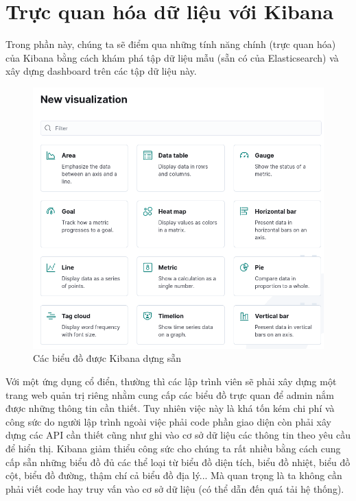 \section{Trực quan hóa dữ liệu với Kibana}
Trong phần này, chúng ta sẽ điểm qua những tính năng chính (trực quan hóa) của Kibana bằng cách khám phá tập dữ liệu mẫu (sẵn có của Elasticsearch) và xây dựng dashboard trên các tập dữ liệu này.

\begin{figure}[H] %
    \centering %
    \includegraphics[width=1\textwidth]{figures/kibana_charts.png} 
    \caption{Các biểu đồ được Kibana dựng sẵn} %
    \label{fig:elk_01}
\end{figure}

Với một ứng dụng cổ điển, thường thì các lập trình viên sẽ phải xây dựng một trang web quản trị riêng nhằm cung cấp các biểu đồ trực quan để admin nắm được những thông tin cần thiết. Tuy nhiên việc này là khá tốn kém chi phí và công sức do người lập trình ngoài việc phải code phần giao diện còn phải xây dựng các API cần thiết cũng như ghi vào cơ sở dữ liệu các thông tin theo yêu cầu để hiển thị. Kibana giảm thiểu công sức cho chúng ta rất nhiều bằng cách cung cấp sẵn những biểu đồ đủ các thể loại từ biểu đồ diện tích, biểu đồ nhiệt, biểu đồ cột, biểu đồ đường, thậm chí cả biểu đồ địa lý... Mà quan trọng là ta không cần phải viết code hay truy vấn vào cơ sở dữ liệu (có thể dẫn đến quá tải hệ thống).

